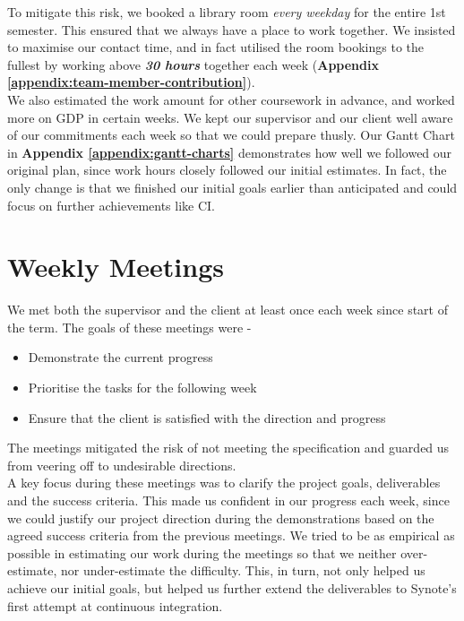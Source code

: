 To mitigate this risk, we booked a library room \textit{every weekday} for the entire 1st semester. This ensured that we always have a place to work together. We insisted to maximise our contact time, and in fact utilised the room bookings to the fullest by working above \textit{\textbf{30 hours}} together each week (\textbf{Appendix \ref{appendix:team-member-contribution}}).\\

We also estimated the work amount for other coursework in advance, and worked more on GDP in certain weeks. We kept our supervisor and our client well aware of our commitments each week so that we could prepare thusly. Our Gantt Chart in \textbf{Appendix \ref{appendix:gantt-charts}} demonstrates how well we followed our original plan, since work hours closely followed our initial estimates. In fact, the only change is that we finished our initial goals earlier than anticipated and could focus on further achievements like CI.

\section{Weekly Meetings}
\label{sec:weekly-meetings}
We met both the supervisor and the client at least once each week since start of the term. The goals of these meetings were -

\begin{itemize}

  \item Demonstrate the current progress
  \item Prioritise the tasks for the following week
  \item Ensure that the client is satisfied with the direction and progress

\end{itemize}

The meetings mitigated the risk of not meeting the specification and guarded us from veering off to undesirable directions.\\

A key focus during these meetings was to clarify the project goals, deliverables and the success criteria. This made us confident in our progress each week, since we could justify our project direction during the demonstrations based on the agreed success criteria from the previous meetings. We tried to be as empirical as possible in estimating our work during the meetings so that we neither over-estimate, nor under-estimate the difficulty. This, in turn, not only helped us achieve our initial goals, but helped us further extend the deliverables to Synote's first attempt at continuous integration. \\

